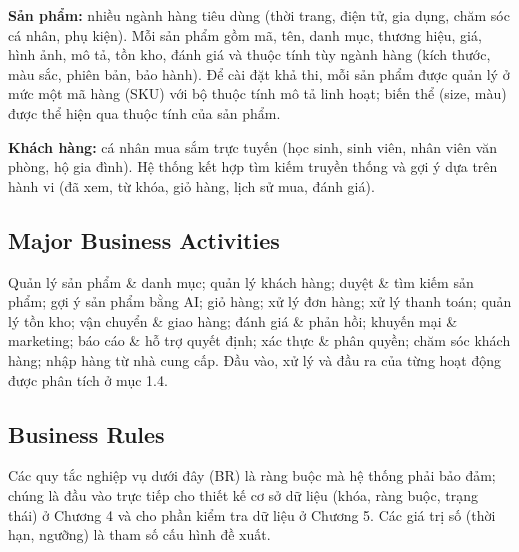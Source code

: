\documentclass[12pt,a4paper,oneside]{report}
\begin{document}
\textbf{Sản phẩm:} nhiều ngành hàng tiêu dùng (thời trang, điện tử, gia dụng, chăm sóc cá nhân, phụ kiện). Mỗi sản phẩm gồm mã, tên, danh mục, thương hiệu, giá, hình ảnh, mô tả, tồn kho, đánh giá và thuộc tính tùy ngành hàng (kích thước, màu sắc, phiên bản, bảo hành). Để cài đặt khả thi, mỗi sản phẩm được quản lý ở mức một mã hàng (SKU) với bộ thuộc tính mô tả linh hoạt; biến thể (size, màu) được thể hiện qua thuộc tính của sản phẩm.

\textbf{Khách hàng:} cá nhân mua sắm trực tuyến (học sinh, sinh viên, nhân viên văn phòng, hộ gia đình). Hệ thống kết hợp tìm kiếm truyền thống và gợi ý dựa trên hành vi (đã xem, từ khóa, giỏ hàng, lịch sử mua, đánh giá).

\subsection{Major Business Activities}

Quản lý sản phẩm \& danh mục; quản lý khách hàng; duyệt \& tìm kiếm sản phẩm; gợi ý sản phẩm bằng AI; giỏ hàng; xử lý đơn hàng; xử lý thanh toán; quản lý tồn kho; vận chuyển \& giao hàng; đánh giá \& phản hồi; khuyến mại \& marketing; báo cáo \& hỗ trợ quyết định; xác thực \& phân quyền; chăm sóc khách hàng; nhập hàng từ nhà cung cấp. Đầu vào, xử lý và đầu ra của từng hoạt động được phân tích ở mục 1.4.

\subsection{Business Rules}

Các quy tắc nghiệp vụ dưới đây (BR) là ràng buộc mà hệ thống phải bảo đảm; chúng là đầu vào trực tiếp cho thiết kế cơ sở dữ liệu (khóa, ràng buộc, trạng thái) ở Chương 4 và cho phần kiểm tra dữ liệu ở Chương 5. Các giá trị số (thời hạn, ngưỡng) là tham số cấu hình đề xuất.
\end{document}
